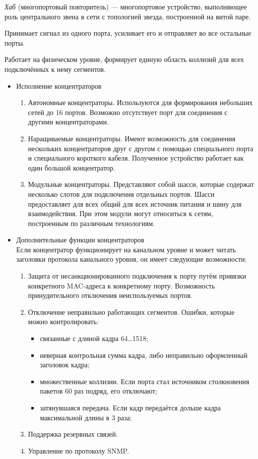 \documentclass[12pt, russian, oneside, article]{ncc}
\begin{document}
\emph{Хаб} (многопортовый повторитель) --- многопортовое устройство, выполняющее роль центрального звена в сети с топологией звезда, построенной на витой паре.

Принимает сигнал из одного порта, усиливает его и отправляет во все остальные порты.

Работает на физическом уровне, формирует единую область коллизий для всех подключённых к нему сегментов.
\begin{itemize}

\item Исполнение концентраторов\\
\label{sec-4_8_2_1}%
\begin{enumerate}
\item Автономные концентраторы. Используются для формирования небольших сетей до 16 портов. Возможно отсутствует порт для соединения с другими концентраторами.
\item Наращиваемые концентраторы. Имеют возможность для соединения нескольких концентраторов друг с другом с помощью специального порта и специального короткого кабеля. Полученное устройство работает как один большой концентратор.
\item Модульные концентраторы. Представляют собой шасси, которые содержат несколько слотов для подключения отдельных портов. Шасси предоставляет для всех общий для всех источник питания и шину для взаимодействия. При этом модули могут относиться к сетям, построенным по различным технологиям.
\end{enumerate}


\item Дополнительные функции концентраторов\\
\label{sec-4_8_2_2}%
Если концентратор функционирует на канальном уровне и может читать заголовки протокола канального уровня, он имеет следующие возможности:
\begin{enumerate}
\item Защита от несанкционированного подключения к порту путём привязки конкретного MAC-адреса к конкретному порту. Возможность принудительного отключения неиспользуемых портов.
\item Отключение неправильно работающих сегментов. Ошибки, которые можно контролировать:

\begin{itemize}
\item связанные с длиной кадра 64\ldots{}1518;
\item неверная контрольная сумма кадра, либо неправильно оформленный заголовок кадра;
\item множественные коллизии. Если порта стал источником столкновения пакетов 60 раз подряд, его отключают;
\item затянувшаяся передача. Если кадр передаётся дольше кадра максимальной длины в 3 раза;
\end{itemize}

\item Поддержка резервных связей.
\item Управление по протоколу SNMP.
\end{enumerate}

\end{itemize} %
\end{document}
